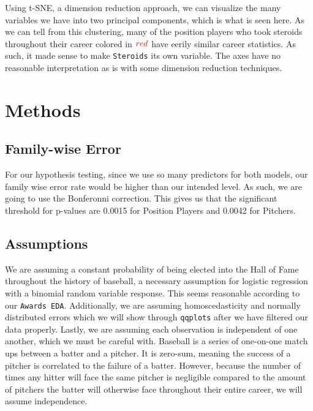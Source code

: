 \documentclass[
]{article}
\begin{document}
Using t-SNE, a dimension reduction approach, we can visualize the many
variables we have into two principal components, which is what is seen
here. As we can tell from this clustering, many of the position players
who took steroids throughout their career colored in
\(\textcolor{red}{red}\) have eerily similar career statistics. As such,
it made sense to make \texttt{Steroids} its own variable. The axes have
no reasonable interpretation as is with some dimension reduction
techniques.

\hypertarget{methods}{%
\section{Methods}\label{methods}}

\hypertarget{family-wise-error}{%
\subsection{Family-wise Error}\label{family-wise-error}}

For our hypothesis testing, since we use so many predictors for both
models, our family wise error rate would be higher than our intended
level. As such, we are going to use the Bonferonni correction. This
gives us that the significant threshold for p-values are 0.0015 for
Position Players and 0.0042 for Pitchers.

\hypertarget{assumptions}{%
\subsection{Assumptions}\label{assumptions}}

We are assuming a constant probability of being elected into the Hall of
Fame throughout the history of baseball, a necessary assumption for
logistic regression with a binomial random variable response. This seems
reasonable according to our \texttt{Awards\ EDA}. Additionally, we are
assuming homoscedasticity and normally distributed errors which we will
show through \texttt{qqplots} after we have filtered our data properly.
Lastly, we are assuming each observation is independent of one another,
which we must be careful with. Baseball is a series of one-on-one match
ups between a batter and a pitcher. It is zero-sum, meaning the success
of a pitcher is correlated to the failure of a batter. However, because
the number of times any hitter will face the same pitcher is negligible
compared to the amount of pitchers the batter will otherwise face
throughout their entire career, we will assume independence.
\end{document}
